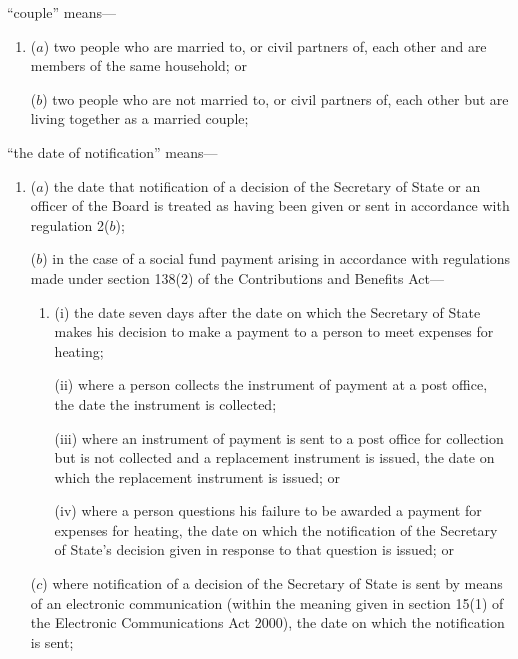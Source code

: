 \documentclass[12pt,a4paper]{article}
\begin{document}
\begin{enumerate}
“couple” means—
\begin{enumerate}\item[]
($a$) 
two people who are married to, or civil partners of, each other and are members of the same household; or

($b$) 
two people who are not married to, or civil partners of, each other but are living together as a married couple;
\end{enumerate}

“the date of notification” means—
\begin{enumerate}\item[]
($a$) the date that notification of a decision of the Secretary of State 
or an officer of the Board  %
is treated as having been given or sent in accordance with regulation 2($b$); 

($b$) in the case of a social fund payment arising in accordance with regulations made under section 138(2) of the Contributions and Benefits Act—
\begin{enumerate}\item[]
(i) the date seven days after the date on which the Secretary of State makes his decision to make a payment to a person to meet expenses for heating;

(ii) where a person collects the instrument of payment at a post office, the date the instrument is collected;

(iii) where an instrument of payment is sent to a post office for collection but is not collected and a replacement instrument is issued, the date on which the replacement instrument is issued; or

(iv) where a person questions his failure to be awarded a payment for expenses for heating, the date on which the notification of the Secretary of State’s decision given in response to that question is issued; or
\end{enumerate}

($c$) where notification of a decision of the Secretary of State is sent by means of an electronic communication (within the meaning given in section 15(1) of the Electronic Communications Act 2000), the date on which the notification is sent;
\end{enumerate}


\end{enumerate}
\end{document}
